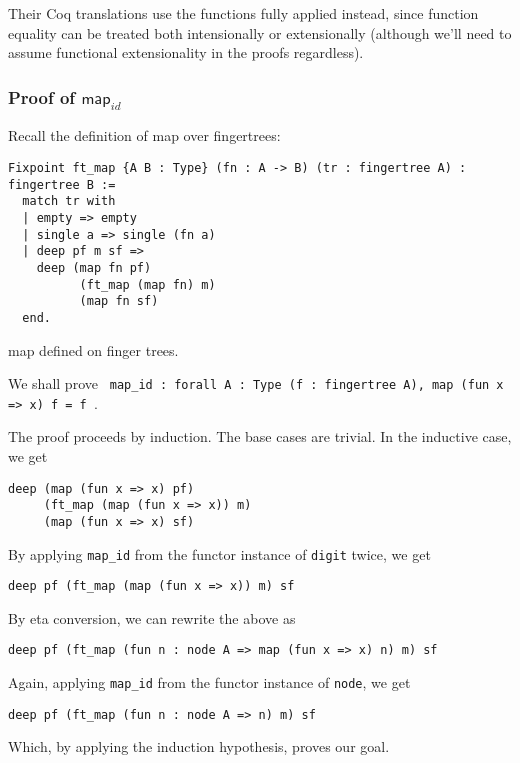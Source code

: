 \documentclass{article}
\newcommand{\code}[1]{\texttt{#1}}
\begin{document}
Their Coq translations use the functions fully applied instead, since function
equality can be treated both intensionally or extensionally (although we'll need
to assume functional extensionality in the proofs regardless).

\subsubsection*{Proof of $\textsf{map}_{id}$}
Recall the definition of map over fingertrees:

\begin{listing}[H]
\begin{verbatim}
Fixpoint ft_map {A B : Type} (fn : A -> B) (tr : fingertree A) : fingertree B :=
  match tr with
  | empty => empty
  | single a => single (fn a)
  | deep pf m sf =>
    deep (map fn pf)
          (ft_map (map fn) m)
          (map fn sf)
  end.
\end{verbatim}
\caption{\textsf{map} defined on finger trees.}
\end{listing}

We shall prove
\texttt{
  map_id : forall {A : Type} (f : fingertree A), map (fun x => x) f = f
}.

The proof proceeds by induction. The base cases are trivial. In the
inductive case, we get

\begin{verbatim}
deep (map (fun x => x) pf)
     (ft_map (map (fun x => x)) m)
     (map (fun x => x) sf)
\end{verbatim}

By applying \code{map\_id} from the functor instance of \code{digit} twice, we get
\begin{verbatim}
deep pf (ft_map (map (fun x => x)) m) sf
\end{verbatim}

By eta conversion, we can rewrite the above as
\begin{verbatim}
deep pf (ft_map (fun n : node A => map (fun x => x) n) m) sf
\end{verbatim}

Again, applying \code{map\_id} from the functor instance of \code{node}, we
get

\begin{verbatim}
deep pf (ft_map (fun n : node A => n) m) sf
\end{verbatim}

Which, by applying the induction hypothesis, proves our goal.
\end{document}

